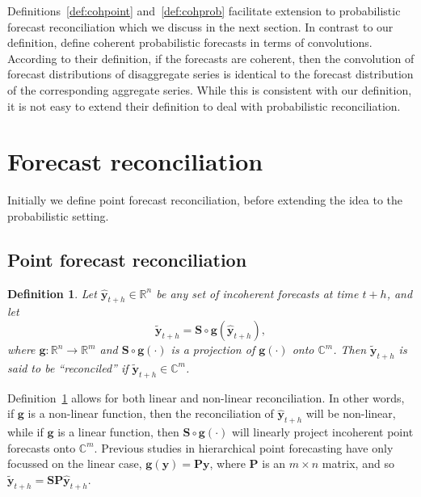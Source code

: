 \documentclass[a4paper, 11pt]{article}
\newtheorem{definition}{Definition}[section]
\begin{document}
Definitions~\ref{def:cohpoint} and~\ref{def:cohprob} facilitate extension to probabilistic forecast reconciliation which we discuss in the next section. In contrast to our definition, \citet{BenTaieb2017} define coherent probabilistic forecasts in terms of convolutions. According to their definition, if the forecasts are coherent, then the convolution of forecast distributions of disaggregate series is identical to the forecast distribution of the corresponding aggregate series.  While this is consistent with our definition, it is not easy to extend their definition to deal with probabilistic reconciliation.

\section{Forecast reconciliation}\label{sec:reconciliation}

Initially we define point forecast reconciliation, before extending the idea to the probabilistic setting.

\subsection{Point forecast reconciliation}


\begin{definition}\label{def:reconpoint}
  Let $\hat{\bm{y}}_{t+h} \in \mathbb{R}^n$ be any set of incoherent forecasts at time $t+h$, and let 
  \begin{equation}
    \tilde{\bm{y}}_{t+h}=\bm{S} \circ \bm{g}(\hat{\bm{y}}_{t+h}),
  \end{equation} 
  where $\bm{g}:\mathbb{R}^n \rightarrow \mathbb{R}^m$ and $\bm{S}\circ \bm{g}(\cdot)$ is a projection of $\bm{g}(\cdot)$ onto $\mathbb{C}^m$. Then $\tilde{\bm{y}}_{t+h}$ is said to be ``reconciled'' if  $\tilde{\bm{y}}_{t+h} \in \mathbb{C}^m$.
\end{definition}

Definition~\ref{def:reconpoint} allows for both linear and non-linear reconciliation. In other words, if $\bm{g}$ is a non-linear function, then the reconciliation of $\hat{\bm{y}}_{t+h}$ will be non-linear, while if $\bm{g}$ is a linear function, then $\bm{S}\circ \bm{g}(\cdot)$ will linearly project incoherent point forecasts onto $\mathbb{C}^m$. Previous studies in hierarchical point forecasting have only focussed on the linear case, $\bm{g}(\bm{y}) = \bm{P}\bm{y}$, where $\bm{P}$ is an $m \times n$ matrix, and so $\tilde{\bm{y}}_{t+h}=\bm{S}\bm{P} \hat{\bm{y}}_{t+h}$. 
\end{document}
